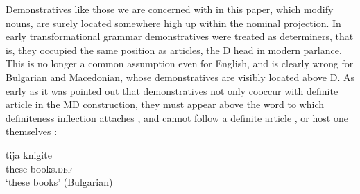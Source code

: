 \documentclass[output=paper,
colorlinks,
citecolor=brown,
newtxmath
]{langscibook}
\begin{document}
Demonstratives like those we are concerned with in this paper, which modify nouns, are surely located somewhere high up within the nominal projection. In early transformational grammar demonstratives were treated as determiners, that is, they occupied the same position as articles, the D head in modern parlance. This is no longer a common assumption even for English, and is clearly wrong for Bulgarian and Macedonian, whose demonstratives are visibly located above D. As early as \cite{Arnaudova1998} it was pointed out that demonstratives not only cooccur with definite article in the MD construction, they must appear above the word to which definiteness inflection attaches , and cannot follow a definite article ,  or host one themselves :

\ea \label{tija}
\gll tija knigite  \\
these books.\textsc{def} \\
\glt `these books' \hfill(Bulgarian)
\z
\ea
{}
\z\z
\end{document}
